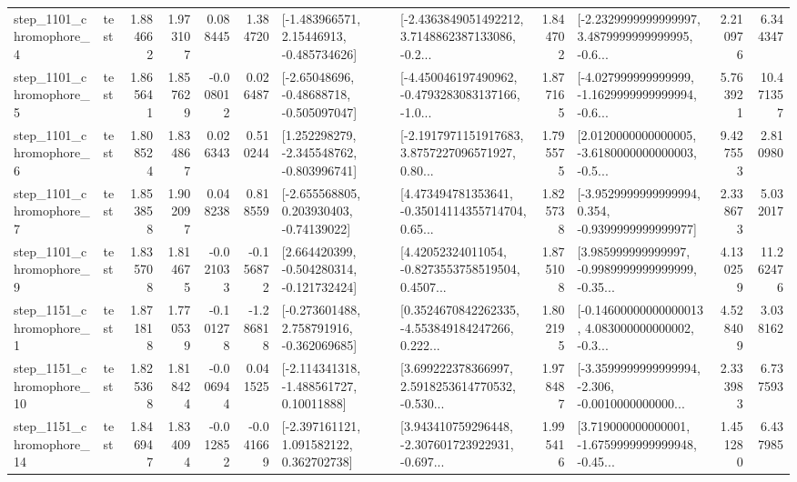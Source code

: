 \begin{tabular}{llrrrrllrlrr}
  step\_1101\_chromophore\_4 &      test &      1.884662 &    1.973107 &      0.088445 &  1.384720 &    [-1.483966571, 2.15446913, -0.485734626] &  [-2.4363849051492212, 3.7148862387133086, -0.2... &       1.844702 &  [-2.2329999999999997, 3.4879999999999995, -0.6... &            2.210976 &          6.344347 \\
  step\_1101\_chromophore\_5 &      test &      1.865641 &    1.857629 &     -0.008012 &  0.026487 &    [-2.65048696, -0.48688718, -0.505097047] &  [-4.450046197490962, -0.4793283083137166, -1.0... &       1.877165 &  [-4.027999999999999, -1.1629999999999994, -0.6... &            5.763921 &         10.471357 \\
  step\_1101\_chromophore\_6 &      test &      1.808524 &    1.834867 &      0.026343 &  0.510244 &   [1.252298279, -2.345548762, -0.803996741] &  [-2.1917971151917683, 3.8757227096571927, 0.80... &       1.795575 &  [2.0120000000000005, -3.6180000000000003, -0.5... &            9.427553 &          2.810980 \\
  step\_1101\_chromophore\_7 &      test &      1.853858 &    1.902097 &      0.048238 &  0.818559 &    [-2.655568805, 0.203930403, -0.74139022] &  [4.473494781353641, -0.35014114355714704, 0.65... &       1.825738 &  [-3.9529999999999994, 0.354, -0.9399999999999977] &            2.338673 &          5.032017 \\
  step\_1101\_chromophore\_9 &      test &      1.835708 &    1.814675 &     -0.021033 & -0.156872 &   [2.664420399, -0.504280314, -0.121732424] &  [4.42052324011054, -0.8273553758519504, 0.4507... &       1.875108 &  [3.985999999999997, -0.9989999999999999, -0.35... &            4.130259 &         11.262476 \\
  step\_1151\_chromophore\_1 &      test &      1.871818 &    1.770539 &     -0.101278 & -1.286818 &   [-0.273601488, 2.758791916, -0.362069685] &  [0.3524670842262335, -4.553849184247266, 0.222... &       1.802195 &  [-0.14600000000000013, 4.083000000000002, -0.3... &            4.528409 &          3.038162 \\
 step\_1151\_chromophore\_10 &      test &      1.825368 &    1.818424 &     -0.006944 &  0.041525 &    [-2.114341318, -1.488561727, 0.10011888] &  [3.699222378366997, 2.5918253614770532, -0.530... &       1.978487 &  [-3.3599999999999994, -2.306, -0.0010000000000... &            2.333983 &          6.737593 \\
 step\_1151\_chromophore\_14 &      test &      1.846947 &    1.834094 &     -0.012852 & -0.041669 &    [-2.397161121, 1.091582122, 0.362702738] &  [3.943410759296448, -2.307601723922931, -0.697... &       1.995416 &  [3.719000000000001, -1.6759999999999948, -0.45... &            1.451280 &          6.437985 \\

\end{tabular}
